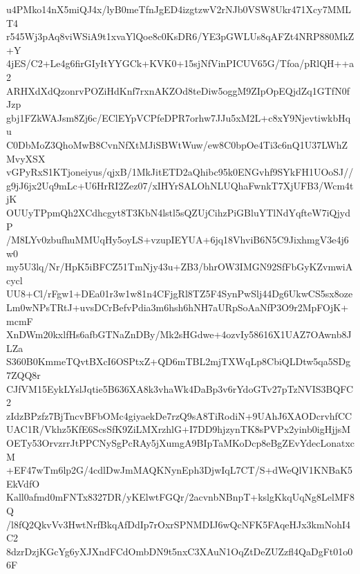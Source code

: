 u4PMko14nX5miQJ4x/lyB0meTfnJgED4izgtzwV2rNJb0VSW8Ukr471Xcy7MMLT4
r545Wj3pAq8viWSiA9t1xvaYlQoe8c0KsDR6/YE3pGWLUs8qAFZt4NRP880MkZ+Y
4jES/C2+Le4g6firGIyItYYGCk+KVK0+15sjNfVinPICUV65G/Tfoa/pRlQH++a2
ARHXdXdQzonrvPOZiHdKnf7rxnAKZOd8teDiw5oggM9ZIpOpEQjdZq1GTfN0fJzp
gbj1FZkWAJsm8Zj6c/EClEYpVCPfeDPR7orhw7JJu5xM2L+c8xY9NjevtiwkbHqu
C0DbMoZ3QhoMwB8CvnNfXtMJiSBWtWuw/ew8C0bpOe4Ti3c6nQ1U37LWhZMvyXSX
vGPyRxS1KTjoneiyus/qjxB/1MkJitETD2aQhibc95k0ENGvhf9SYkFH1UOoSJ//
g9jJ6jx2Uq9mLc+U6HrRI2Zez07/xIHYrSALOhNLUQhaFwnkT7XjUFB3/Wcm4tjK
OUUyTPpmQh2XCdhcgyt8T3KbN4lstl5sQZUjCihzPiGBluYTlNdYqfteW7iQjydP
/M8LYv0zbufhuMMUqHy5oyLS+vzupIEYUA+6jq18VhviB6N5C9JixhmgV3e4j6w0
my5U3lq/Nr/HpK5iBFCZ51TmNjy43u+ZB3/bhrOW3IMGN92SfFbGyKZvmwiAcycl
UU8+Cl/rFgw1+DEa01r3w1w81n4CFjgRl8TZ5F4SynPwSlj44Dg6UkwCS5sx8oze
Lm0wNPsTRtJ+uvsDCrBefvPdia3m6hsh6hNH7aURpSoAaNfP3O9r2MpFOjK+mcmF
XnDWm20kxlfHs6afbGTNaZnDBy/Mk2sHGdwe+4ozvIy58616X1UAZ7OAwnb8JLZa
S360B0KmmeTQvtBXcI6OSPtxZ+QD6mTBL2mjTXWqLp8CbiQLDtw5qa5SDg7ZQQ8r
CJfVM15EykLYslJqtie5B636XA8k3vhaWk4DaBp3v6rYdoGTv27pTzNVIS3BQFC2
zIdzBPzfz7BjTncvBFbOMc4giyaekDe7rzQ9sA8TiRodiN+9UAhJ6XAODcrvhfCC
UAC1R/Vkhz5KfE6ScsSfK9ZiLMXrzhlG+I7DD9hjzynTK8sPVPx2yinb0igHjjsM
OETy53OrvzrrJtPPCNySgPcRAy5jXumgA9BIpTaMKoDcp8eBgZEvYdecLonatxcM
+EF47wTm6lp2G/4cdlDwJmMAQKNynEph3DjwIqL7CT/S+dWeQlV1KNBaK5EkVdfO
Kall0afmd0mFNTx8327DR/yKElwtFGQr/2acvnbNBnpT+kslgKkqUqNg8LelMF8Q
/l8fQ2QkvVv3HwtNrfBkqAfDdIp7rOxrSPNMDIJ6wQcNFK5FAqeHJx3kmNohI4C2
8dzrDzjKGcYg6yXJXndFCdOmbDN9t5nxC3XAuN1OqZtDeZUZzfl4QaDgFt01o06F

